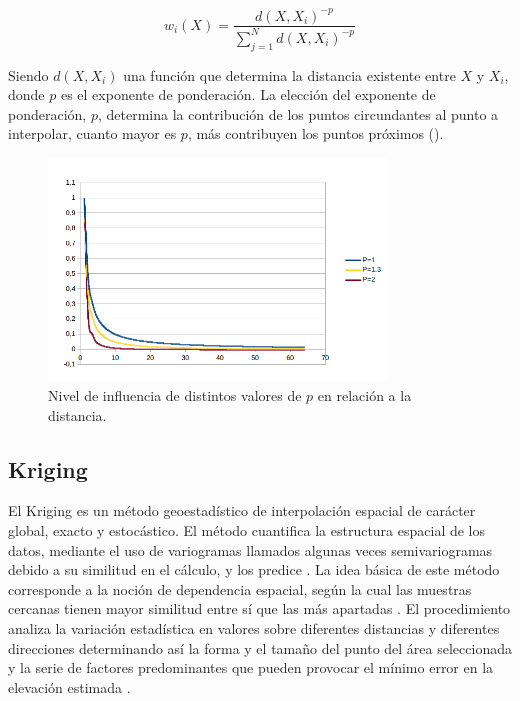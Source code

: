 \begin{equation}
w_i(X) =  \dfrac{d(X, X_i)^{-p}}{\sum_{j=1}^{N} d(X, X_i)^{-p}}
\end{equation}


Siendo $d(X, X_i)$ una función que determina la distancia existente entre $X$ y $X_{i}$, donde $p$
es el exponente de ponderación. La elección del exponente de ponderación, $p$, determina la
contribución de los puntos circundantes al punto a interpolar, cuanto mayor es $p$, más
contribuyen los puntos próximos ().

\begin{figure}[H]
\centering
\includegraphics[width=0.8\textwidth]{capitulo-2/graphics/idw-parametros.png}
\caption{\label{fig:sig-idw-parametros} Nivel de influencia de distintos valores de $p$ en
relación a la distancia.}

\end{figure}

\subsection{Kriging}
El Kriging es un método geoestadístico de interpolación espacial de carácter global, exacto y
estocástico\citep{NINO2011}. El método cuantifica la estructura espacial de los datos, mediante el
uso de variogramas llamados algunas veces semivariogramas debido a su similitud en el cálculo, y
los predice \citep{villatoro2007comparacion}. La idea básica de este método corresponde a la
noción de dependencia espacial, según la cual las muestras cercanas tienen mayor similitud entre
sí que las más apartadas \citep{NINO2011}. El procedimiento analiza la variación estadística en
valores sobre diferentes distancias y diferentes direcciones determinando así la forma y el tamaño
del punto del área seleccionada y la serie de factores predominantes que pueden provocar el mínimo
error en la elevación estimada \citep{cPachecoMDE2003}.

